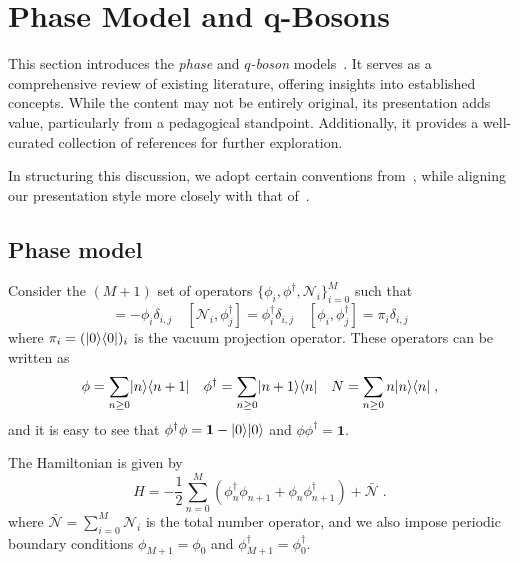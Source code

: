 \documentclass[a4paper,11pt]{amsart}
\begin{document}
\section{Phase Model and q-Bosons}

This section introduces the \emph{phase} and \emph{\(q\)-boson}
models~\cite{Bogoliubov:1992, Bogoliubov:1997soj, Bogoliubov2005,
  Tsilevich:2006}. It serves as a comprehensive review of existing
literature, offering insights into established concepts. While the
content may not be entirely original, its presentation adds value,
particularly from a pedagogical standpoint. Additionally, it provides
a well-curated collection of references for further exploration.

In structuring this discussion, we adopt certain conventions
from~\cite{Wheeler:2010vmq}, while aligning our presentation style
more closely with that of~\cite{Tsilevich:2006}.




\subsection{Phase model}
Consider the \((M+1)\) set of operators \(\{\phi_i,
\phi^\dagger,\mathcal{N}_i\}_{i=0}^M\) such that
\begin{equation}
 [\mathcal{N}_i, \phi_j] = - \phi_i \delta_{i,j} \quad
 [\mathcal{N}_i, \phi_j^\dagger] =  \phi_i^\dagger \delta_{i,j}  \quad 
 [\phi_i, \phi_j^\dagger] =  \pi_i \delta_{i,j}  
\end{equation}
where \(\pi_i =(\lvert0\rangle \langle0\rvert)_i\) is the vacuum projection operator.
These operators can be written as
\begin{equation}
\phi = \sum_{n\geq 0}\lvert n\rangle\langle n+1\rvert\quad 
\phi^\dagger = \sum_{n\geq 0}\lvert n+1\rangle\langle n\rvert \quad 
N = \sum_{n\geq 0}n\lvert n\rangle\langle n\rvert\; ,
\end{equation}
and it is easy to see that \(\phi^\dagger \phi = \bm{1} - \lvert0\rangle
\lvert0\rangle\) and \(\phi\phi^\dagger = \bm{1}\).

The Hamiltonian is given by
\begin{equation}
  H = - \frac{1}{2} \sum_{n =0}^M \left(\phi_n^\dagger \phi_{n+1}
  + \phi_n \phi_{n+1}^\dagger \right) + \bar{\mathcal{N}}\; .
\end{equation}
where \(\bar{\mathcal{N}} = \sum_{i=0}^M \mathcal{N}_i\) is the total
number operator, and we also impose periodic boundary conditions
\(\phi_{M+1} = \phi_0\) and \(\phi_{M+1}^\dagger = \phi_0^\dagger\).
\end{document}
